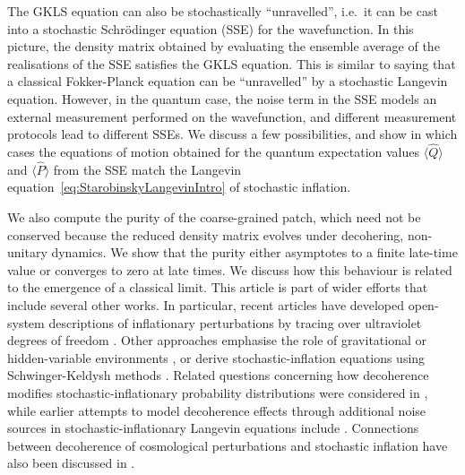 \documentclass{article}
\numberwithin{equation}{section}
\begin{document}
    The GKLS equation can also be stochastically ``unravelled'', i.e.~it can be cast into a stochastic Schr\"odinger equation (SSE) for the wavefunction. In this picture, the density matrix obtained by evaluating the ensemble average of the realisations of the SSE satisfies the GKLS equation. This is similar to saying that a classical Fokker-Planck equation can be ``unravelled'' by a stochastic Langevin equation. However, in the quantum case, the noise term in the SSE models an external measurement performed on the wavefunction, and different measurement protocols lead to different SSEs. We discuss a few possibilities, and show in which cases the equations of motion obtained for the quantum expectation values $\langle \hat{Q} \rangle$ and $\langle \hat{P} \rangle$ from the SSE match the Langevin equation~\eqref{eq:StarobinskyLangevinIntro} of stochastic inflation. 
    
	We also compute the purity of the coarse-grained patch, which need not be conserved because the reduced density matrix evolves under decohering, non-unitary dynamics. We show that the purity either asymptotes to a finite late-time value or converges to zero at late times. We discuss how this behaviour is related to the emergence of a classical limit. This article is part of wider efforts that include several other works. In particular, recent articles have developed open-system descriptions of inflationary perturbations by tracing over ultraviolet degrees of freedom \cite{Burgess:2014eoa, Burgess:2022nwu, Colas:2022hlq, Colas:2022kfu, goldman2024lindbladian,Colas:2024ysu, Burgess:2024eng, Beneke:2026nlo,Cespedes:2026nrg, Lopez2025, Salcedo2026}. Other approaches emphasise the role of gravitational or hidden-variable environments \cite{Akama:2026ent}, or derive stochastic-inflation equations using Schwinger-Keldysh methods \cite{Tokuda:2017fdh,Tokuda:2018eqs,Gorbenko:2019rza,Cespedes:2023aal,Green:2025hmo,Ye:2026saa}. Related questions concerning how decoherence modifies stochastic-inflationary probability distributions were considered in \cite{Boddy:2016zkn}, while earlier attempts to model decoherence effects through additional noise sources in stochastic-inflationary Langevin equations include \cite{Haba:2018ork,Haba:2018akk}. Connections between decoherence of cosmological perturbations and stochastic inflation have also been discussed in \cite{Weenink:2011dd}.
\end{document}
